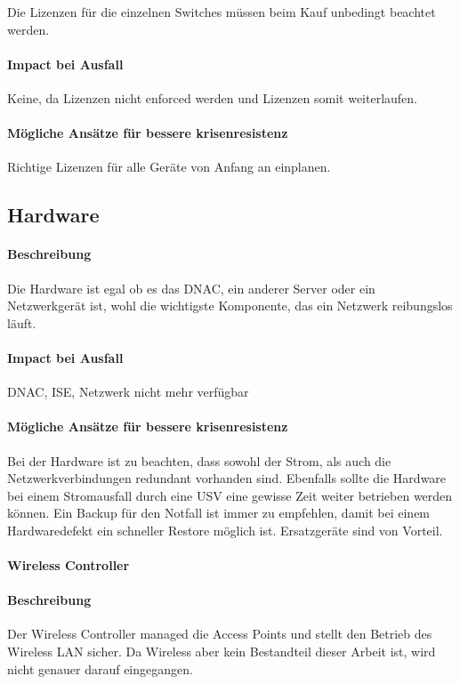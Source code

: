 Die Lizenzen für die einzelnen Switches müssen beim Kauf unbedingt beachtet werden.

\paragraph{Impact bei Ausfall}
Keine, da Lizenzen nicht enforced werden und Lizenzen somit weiterlaufen.

\paragraph{Mögliche Ansätze für bessere krisenresistenz}
Richtige Lizenzen für alle Geräte von Anfang an einplanen.

\subsection{Hardware}
\paragraph{Beschreibung}
Die Hardware ist egal ob es das DNAC, ein anderer Server oder ein Netzwerkgerät ist, wohl die wichtigste Komponente, das ein Netzwerk reibungslos läuft.

\paragraph{Impact bei Ausfall}
DNAC, ISE, Netzwerk nicht mehr verfügbar

\paragraph{Mögliche Ansätze für bessere krisenresistenz}
Bei der Hardware ist zu beachten, dass sowohl der Strom, als auch die Netzwerkverbindungen redundant vorhanden sind. Ebenfalls sollte die Hardware bei einem Stromausfall durch eine USV eine gewisse Zeit weiter betrieben werden können. Ein Backup für den Notfall ist immer zu empfehlen, damit bei einem Hardwaredefekt ein schneller Restore möglich ist.
Ersatzgeräte sind von Vorteil.

\paragraph{Wireless Controller}
\paragraph{Beschreibung}
Der Wireless Controller managed die Access Points und stellt den Betrieb des Wireless LAN sicher. Da Wireless aber kein Bestandteil dieser Arbeit ist, wird nicht genauer darauf eingegangen.

